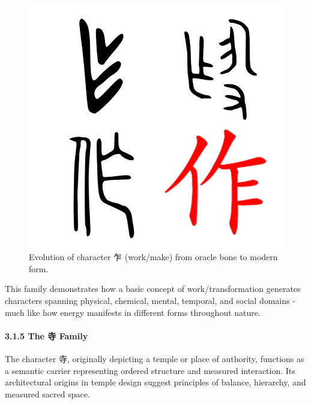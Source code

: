 \begin{figure}
\centering
\includegraphics{./images/zi_work.png}
\caption{Evolution of character 乍 (work/make) from oracle bone to
modern form.}
\end{figure}

This family demonstrates how a basic concept of work/transformation
generates characters spanning physical, chemical, mental, temporal, and
social domains - much like how energy manifests in different forms
throughout nature.

\paragraph{3.1.5 The 寺 Family}\label{the-ux5bfa-family}

The character 寺, originally depicting a temple or place of authority,
functions as a semantic carrier representing ordered structure and
measured interaction. Its architectural origins in temple design suggest
principles of balance, hierarchy, and measured sacred space.

